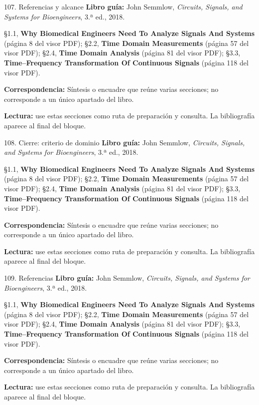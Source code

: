 \documentclass[
  10pt,
  ignorenonframetext,
  aspectratio=169,
  spanish,
]{beamer}
\begin{document}
\begin{frame}{107. Referencias y alcance}
\label{referencias-y-alcance}
\textbf{Libro guía:} John Semmlow, \emph{Circuits, Signals, and Systems
for Bioengineers}, 3.ª ed., 2018.

§1.1, \textbf{Why Biomedical Engineers Need To Analyze Signals And
Systems} (página 8 del visor PDF); §2.2, \textbf{Time Domain
Measurements} (página 57 del visor PDF); §2.4, \textbf{Time Domain
Analysis} (página 81 del visor PDF); §3.3, \textbf{Time--Frequency
Transformation Of Continuous Signals} (página 118 del visor PDF).

\textbf{Correspondencia:} Síntesis o encuadre que reúne varias
secciones; no corresponde a un único apartado del libro.

\textbf{Lectura:} use estas secciones como ruta de preparación y
consulta. La bibliografía aparece al final del bloque.
\end{frame}

\begin{frame}{108. Cierre: criterio de dominio}
\label{cierre-criterio-de-dominio}
\textbf{Libro guía:} John Semmlow, \emph{Circuits, Signals, and Systems
for Bioengineers}, 3.ª ed., 2018.

§1.1, \textbf{Why Biomedical Engineers Need To Analyze Signals And
Systems} (página 8 del visor PDF); §2.2, \textbf{Time Domain
Measurements} (página 57 del visor PDF); §2.4, \textbf{Time Domain
Analysis} (página 81 del visor PDF); §3.3, \textbf{Time--Frequency
Transformation Of Continuous Signals} (página 118 del visor PDF).

\textbf{Correspondencia:} Síntesis o encuadre que reúne varias
secciones; no corresponde a un único apartado del libro.

\textbf{Lectura:} use estas secciones como ruta de preparación y
consulta. La bibliografía aparece al final del bloque.
\end{frame}

\begin{frame}{109. Referencias}
\label{referencias}
\textbf{Libro guía:} John Semmlow, \emph{Circuits, Signals, and Systems
for Bioengineers}, 3.ª ed., 2018.

§1.1, \textbf{Why Biomedical Engineers Need To Analyze Signals And
Systems} (página 8 del visor PDF); §2.2, \textbf{Time Domain
Measurements} (página 57 del visor PDF); §2.4, \textbf{Time Domain
Analysis} (página 81 del visor PDF); §3.3, \textbf{Time--Frequency
Transformation Of Continuous Signals} (página 118 del visor PDF).

\textbf{Correspondencia:} Síntesis o encuadre que reúne varias
secciones; no corresponde a un único apartado del libro.

\textbf{Lectura:} use estas secciones como ruta de preparación y
consulta. La bibliografía aparece al final del bloque.
\end{frame}
\end{document}
